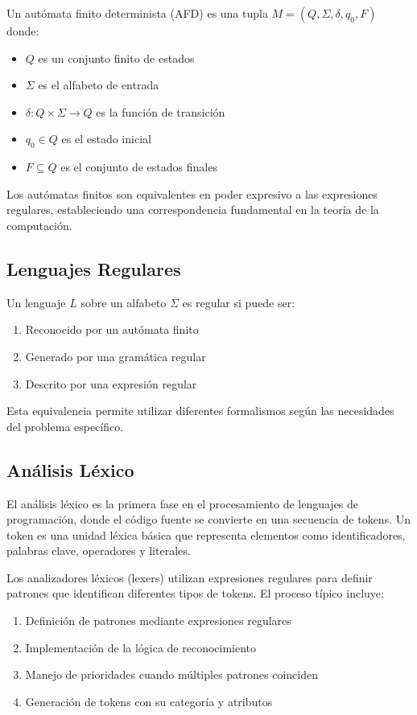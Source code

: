 \documentclass[10pt,letterpaper]{article}
\begin{document}
Un autómata finito determinista (AFD) es una tupla $M = (Q, \Sigma, \delta, q_0, F)$ donde:
\begin{itemize}
    \item $Q$ es un conjunto finito de estados
    \item $\Sigma$ es el alfabeto de entrada
    \item $\delta: Q \times \Sigma \rightarrow Q$ es la función de transición
    \item $q_0 \in Q$ es el estado inicial
    \item $F \subseteq Q$ es el conjunto de estados finales
\end{itemize}

Los autómatas finitos son equivalentes en poder expresivo a las expresiones regulares, estableciendo una correspondencia fundamental en la teoría de la computación.

\subsection{Lenguajes Regulares}

Un lenguaje $L$ sobre un alfabeto $\Sigma$ es regular si puede ser:
\begin{enumerate}
    \item Reconocido por un autómata finito
    \item Generado por una gramática regular
    \item Descrito por una expresión regular
\end{enumerate}

Esta equivalencia permite utilizar diferentes formalismos según las necesidades del problema específico.

\subsection{Análisis Léxico}

El análisis léxico es la primera fase en el procesamiento de lenguajes de programación, donde el código fuente se convierte en una secuencia de tokens. Un token es una unidad léxica básica que representa elementos como identificadores, palabras clave, operadores y literales.

Los analizadores léxicos (lexers) utilizan expresiones regulares para definir patrones que identifican diferentes tipos de tokens. El proceso típico incluye:

\begin{enumerate}
    \item Definición de patrones mediante expresiones regulares
    \item Implementación de la lógica de reconocimiento
    \item Manejo de prioridades cuando múltiples patrones coinciden
    \item Generación de tokens con su categoría y atributos
\end{enumerate}
\end{document}
